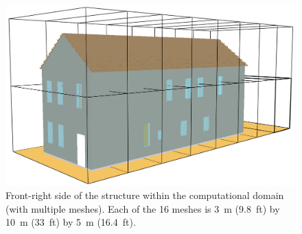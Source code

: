 \documentclass[12pt,oneside]{book}
\begin{document}
\begin{figure}[!ht]
\centering
\includegraphics[width=.60\textwidth]{../Figures/smv_exterior_mesh}
\caption[Front-right side of the structure within the computational domain.]{Front-right side of the structure within the computational domain (with multiple meshes). Each of the 16 meshes is 3~m (9.8~ft) by 10~m (33~ft) by 5~m (16.4~ft).}
\label{fig:mult_mesh}
\end{figure}
\end{document}
